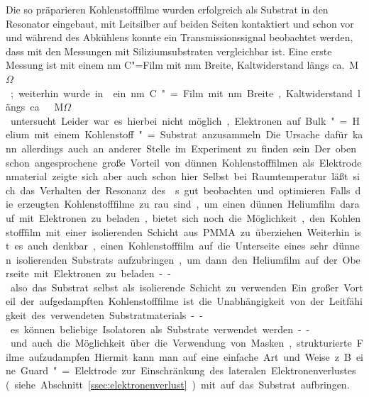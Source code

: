 Die so präparieren Kohlenstofffilme wurden erfolgreich als Substrat in den Resonator eingebaut, mit Leitsilber auf beiden Seiten kontaktiert und schon vor und während des Abkühlens konnte ein Transmissionssignal beobachtet werden, dass mit den Messungen mit Siliziumsubstraten vergleichbar ist. Eine erste Messung ist  mit einem \unit[7]{nm} C"=Film mit \unit[5]{mm} Breite, Kaltwiderstand längs ca.\ \unit[8]{M$\Omega$} ; weiterhin wurde in  ein \unit[15]{nm} C"=Film mit \unit[7]{nm} Breite, Kaltwiderstand längs ca.\ \unit[1]{M$\Omega$} untersucht. Leider war es hierbei nicht möglich, Elektronen auf Bulk"=Helium mit einem Kohlenstoff"=Substrat anzusammeln. Die Ursache dafür kann allerdings auch an anderer Stelle im Experiment zu finden sein. Der oben schon angesprochene große Vorteil von dünnen Kohlenstofffilmen als Elektrodenmaterial zeigte sich aber auch schon hier. Selbst bei Raumtemperatur läßt sich das Verhalten der Resonanz des \HR{}s gut beobachten und optimieren.

Falls die erzeugten Kohlenstofffilme zu rau sind, um einen dünnen Heliumfilm darauf mit Elektronen zu beladen, bietet sich noch die Möglichkeit, den Kohlenstofffilm mit einer isolierenden Schicht aus PMMA zu überziehen. Weiterhin ist es auch denkbar, einen Kohlenstofffilm auf die Unterseite eines sehr dünnen isolierenden Substrats aufzubringen, um dann den Heliumfilm auf der Oberseite mit Elektronen zu beladen -- also das Substrat selbst als isolierende Schicht zu verwenden.

Ein großer Vorteil der aufgedampften Kohlenstofffilme ist die Unabhängigkeit von der Leitfähigkeit des verwendeten Substratmaterials -- es können beliebige Isolatoren als Substrate verwendet werden -- und auch die Möglichkeit über die Verwendung von Masken, strukturierte Filme aufzudampfen. Hiermit kann man auf eine einfache Art und Weise z.~B. eine Guard"=Elektrode zur Einschränkung des lateralen Elektronenverlustes (siehe Abschnitt~\ref{ssec:elektronenverlust}) mit auf das Substrat aufbringen.

